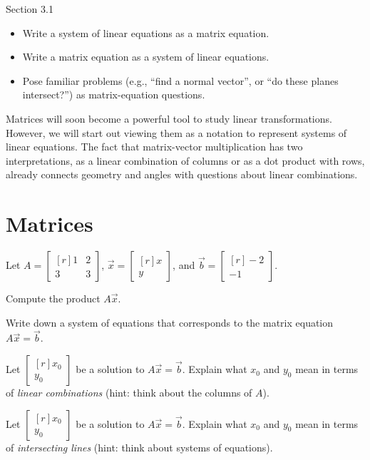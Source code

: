 \documentclass{problemset}
\newcommand{\mat}[1]{\begin{bmatrix*}[r]#1\end{bmatrix*}}
\begin{document}
\begin{lesson}
	\newpage

	Section 3.1

	\begin{itemize}
		\item Write a system of linear equations as a matrix equation.
		\item Write a matrix equation as a system of linear equations.
		\item Pose familiar problems (e.g., ``find a normal vector'', or 
			``do these planes intersect\mbox{?}'') as matrix-equation
			questions.
	\end{itemize}

	Matrices will soon become a powerful tool to study linear transformations.
	However, we will start out viewing them as a notation to represent
	systems of linear equations. The fact that matrix-vector multiplication
	has two interpretations, as a linear combination of columns or as a dot product
	with rows, already connects geometry and angles with questions about linear combinations.

	\newpage
\end{lesson}
\section*{Matrices}
	
	\question
	Let $A=\mat{1&2\\3&3}$, $\vec x=\mat{x\\y}$, and $\vec b=\mat{-2\\-1}$.
	\begin{parts}
		\item Compute the product $A\vec x$.
		\item Write down a system of equations that corresponds to the matrix equation
			$A\vec x=\vec b$.
		\item Let $\mat{x_0\\y_0}$ be a solution to $A\vec x=\vec b$. Explain what
			$x_0$ and $y_0$ mean in terms of \emph{linear combinations} (hint: think
			about the columns of $A$).
		\item Let $\mat{x_0\\y_0}$ be a solution to $A\vec x=\vec b$. Explain what
			$x_0$ and $y_0$ mean in terms of \emph{intersecting lines} (hint: think
			about systems of equations).
	\end{parts}
\end{document}
